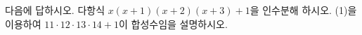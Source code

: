 다음에 답하시오.
 다항식 $x(x+1)(x+2)(x+3)+1$을 인수분해 하시오.
 (1)을 이용하여 $11\cdot 12\cdot 13\cdot 14+1$이 합성수임을 설명하시오.
